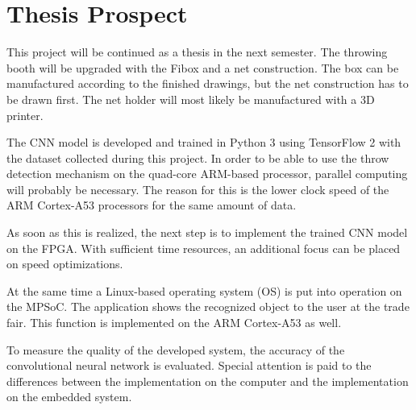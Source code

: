 \section{Thesis Prospect}
\label{sec:thesis_prospect}

This project will be continued as a thesis in the next semester.
The throwing booth will be upgraded with the Fibox and a net construction.
The box can be manufactured according to the finished drawings, but the net construction has to be drawn first.
The net holder will most likely be manufactured with a 3D printer.

The CNN model is developed and trained in Python 3 using TensorFlow 2 with the dataset collected during this project.
In order to be able to use the throw detection mechanism on the quad-core ARM-based processor, parallel computing will probably be necessary.
The reason for this is the lower clock speed of the ARM Cortex-A53 processors for the same amount of data.

As soon as this is realized, the next step is to implement the trained CNN model on the FPGA.
With sufficient time resources, an additional focus can be placed on speed optimizations.

At the same time a Linux-based operating system (OS) is put into operation on the MPSoC.
The application shows the recognized object to the user at the trade fair.
This function is implemented on the ARM Cortex-A53 as well.

To measure the quality of the developed system, the accuracy of the convolutional neural network is evaluated.
Special attention is paid to the differences between the implementation on the computer and the implementation on the embedded system.
